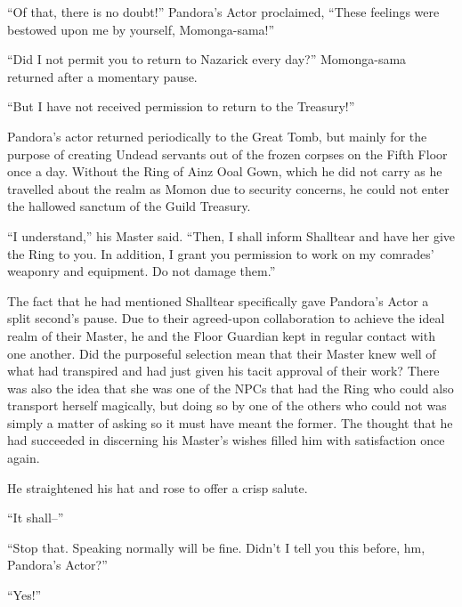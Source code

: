 

“Of that, there is no doubt!” Pandora’s Actor proclaimed, “These feelings were bestowed upon me by yourself, Momonga-sama!”

 

“Did I not permit you to return to Nazarick every day?” Momonga-sama returned after a momentary pause.

 

“But I have not received permission to return to the Treasury!”

 

Pandora’s actor returned periodically to the Great Tomb, but mainly for the purpose of creating Undead servants out of the frozen corpses on the Fifth Floor once a day. Without the Ring of Ainz Ooal Gown, which he did not carry as he travelled about the realm as Momon due to security concerns, he could not enter the hallowed sanctum of the Guild Treasury.

 

“I understand,” his Master said. “Then, I shall inform Shalltear and have her give the Ring to you. In addition, I grant you permission to work on my comrades’ weaponry and equipment. Do not damage them.”

 

The fact that he had mentioned Shalltear specifically gave Pandora’s Actor a split second’s pause. Due to their agreed-upon collaboration to achieve the ideal realm of their Master, he and the Floor Guardian kept in regular contact with one another. Did the purposeful selection mean that their Master knew well of what had transpired and had just given his tacit approval of their work? There was also the idea that she was one of the NPCs that had the Ring who could also transport herself magically, but doing so by one of the others who could not was simply a matter of asking so it must have meant the former. The thought that he had succeeded in discerning his Master’s wishes filled him with satisfaction once again.

 

He straightened his hat and rose to offer a crisp salute.

 

“It shall–”

 

“Stop that. Speaking normally will be fine. Didn’t I tell you this before, hm, Pandora’s Actor?”

 

“Yes!”

 

